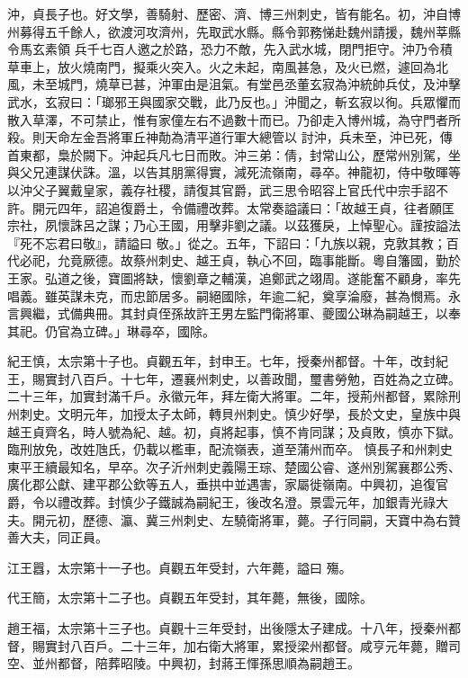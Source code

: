 \begin{pinyinscope}
 沖，貞長子也。好文學，善騎射、歷密、濟、博三州刺史，皆有能名。初，沖自博州募得五千餘人，欲渡河攻濟州，先取武水縣。縣令郭務悌赴魏州請援，魏州莘縣令馬玄素領
 兵千七百人邀之於路，恐力不敵，先入武水城，閉門拒守。沖乃令積草車上，放火燒南門，擬乘火突入。火之未起，南風甚急，及火已燃，遽回為北風，未至城門，燒草已甚，沖軍由是沮氣。有堂邑丞董玄寂為沖統帥兵仗，及沖擊武水，玄寂曰：「瑯邪王與國家交戰，此乃反也。」沖聞之，斬玄寂以徇。兵眾懼而散入草澤，不可禁止，惟有家僮左右不過數十而已。乃卻走入博州城，為守門者所殺。則天命左金吾將軍丘神勣為清平道行軍大總管以
 討沖，兵未至，沖已死，傳首東都，梟於闕下。沖起兵凡七日而敗。沖三弟：倩，封常山公，歷常州別駕，坐與父兄連謀伏誅。溫，以告其朋黨得實，減死流嶺南，尋卒。神龍初，侍中敬暉等以沖父子翼戴皇家，義存社稷，請復其官爵，武三思令昭容上官氏代中宗手詔不許。開元四年，詔追復爵土，令備禮改葬。太常奏謚議曰：「故越王貞，往者願匡宗社，夙懷誅呂之謀；乃心王國，用擊非劉之議。以茲獲戾，上悼聖心。謹按謚法『死不忘君曰敬』，請謚曰
 敬。」從之。五年，下詔曰：「九族以親，克敦其教；百代必祀，允竟厥德。故蔡州刺史、越王貞，執心不回，臨事能斷。粵自籓國，勤於王家。弘道之後，寶圖將缺，懷劉章之輔漢，追鄭武之翊周。遂能奮不顧身，率先唱義。雖英謀未克，而忠節居多。嗣絕國除，年逾二紀，奠享淪廢，甚為憫焉。永言興繼，式備典冊。其封貞侄孫故許王男左監門衛將軍、夔國公琳為嗣越王，以奉其祀。仍官為立碑。」琳尋卒，國除。



 紀王慎，太宗第十子也。貞觀五年，封申王。七年，授秦州都督。十年，改封紀王，賜實封八百戶。十七年，遷襄州刺史，以善政聞，璽書勞勉，百姓為之立碑。二十三年，加實封滿千戶。永徽元年，拜左衛大將軍。二年，授荊州都督，累除刑州刺史。文明元年，加授太子太師，轉貝州刺史。慎少好學，長於文史，皇族中與越王貞齊名，時人號為紀、越。初，貞將起事，慎不肯同謀；及貞敗，慎亦下獄。臨刑放免，改姓虺氏，仍載以檻車，配流嶺表，道至蒲州而卒。
 慎長子和州刺史東平王續最知名，早卒。次子沂州刺史義陽王琮、楚國公睿、遂州別駕襄郡公秀、廣化郡公獻、建平郡公欽等五人，垂拱中並遇害，家屬徙嶺南。中興初，追復官爵，令以禮改葬。封慎少子鐵誠為嗣紀王，後改名澄。景雲元年，加銀青光祿大夫。開元初，歷德、瀛、冀三州刺史、左驍衛將軍，薨。子行同嗣，天寶中為右贊善大夫，同正員。



 江王囂，太宗第十一子也。貞觀五年受封，六年薨，謚曰
 殤。



 代王簡，太宗第十二子也。貞觀五年受封，其年薨，無後，國除。



 趙王福，太宗第十三子也。貞觀十三年受封，出後隱太子建成。十八年，授秦州都督，賜實封八百戶。二十三年，加右衛大將軍，累授梁州都督。咸亨元年薨，贈司空、並州都督，陪葬昭陵。中興初，封蔣王惲孫思順為嗣趙王。




\end{pinyinscope}
